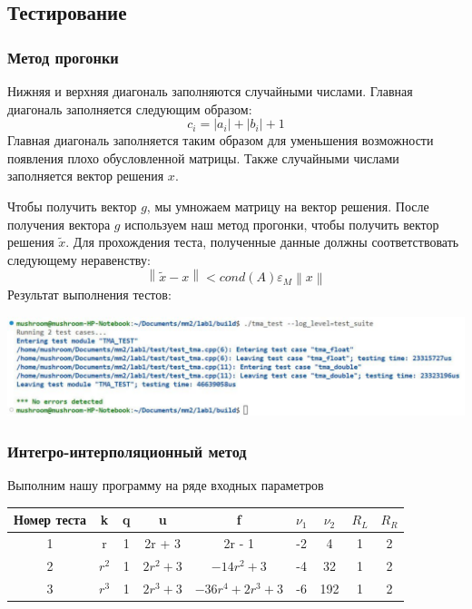\subsection{Тестирование}

\subsubsection{Метод прогонки}

Нижняя и верхняя диагональ заполняются случайными числами. Главная диагональ заполняется следующим образом:
\[
  c_i = \left\lvert a_i \right\rvert + \left\lvert b_i \right\rvert + 1
\]
Главная диагональ заполняется таким образом для уменьшения возможности появления плохо обусловленной матрицы.
Также случайными числами заполняется вектор решения $ x $.

Чтобы получить вектор $ g $, мы умножаем матрицу на вектор решения. После получения вектора $ g $
используем наш метод прогонки, чтобы получить вектор решения $ \tilde{x} $. Для прохождения теста, полученные данные должны
соответствовать следующему неравенству:
\[
  \left\lVert \tilde{x} - x \right\rVert < cond(A) \varepsilon_M \left\lVert x \right\rVert 
\]
Результат выполнения тестов:
\begin{center}
  \includegraphics[width=\textwidth]{img/test.pdf}
\end{center}

\subsubsection{Интегро-интерполяционный метод}

Выполним нашу программу на ряде входных параметров

\begin{table}[H]
  \centering
  \begin{tabular}{ c | *{8}c }
    \toprule
    Номер теста & k & q & u & f & $\nu_1 $ & $\nu_2 $ & $R_L$ & $R_R$\\
    \midrule
    1 & r & 1 & 2r + 3 & 2r - 1 & -2 & 4 & 1 & 2 \\
    \midrule
    2 & $r^2$ & 1 & $2r^2 + 3$ & $-14r^2 + 3$ & -4 & 32 & 1 & 2 \\
    \midrule
    3 & $r^3$ & 1 & $2r^3 + 3$ & $-36r^4 + 2r^3 + 3$ & -6 & 192 & 1 & 2 \\
    \bottomrule
  \end{tabular}
\end{table}


